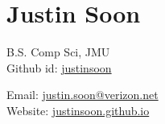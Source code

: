 \documentclass[a4paper]{article}
\author{Justin Soon}
\begin{document}
\section*{\huge\textbf Justin Soon}
\begin{minipage}{.45\linewidth}
	\begin{flushleft}
		B.S. Comp Sci, JMU\\
		Github id: \href{https://github.com/justinsoon}{justinsoon}\\
	\end{flushleft}
\end{minipage}
\hfill
\begin{minipage}{.45\linewidth}
	\begin{flushright}
		Email: \href{mailto:justin.soon@verizon.net}{justin.soon@verizon.net}\\
		Website: \href{http://justinsoon.github.io/}{justinsoon.github.io}\\
	\end{flushright}
\end{minipage}

\end{document}
